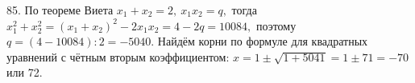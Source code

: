 85. По теореме Виета $x_1+x_2=2,\ x_1x_2=q,$ тогда $x_1^2+x_2^2=(x_1+x_2)^2-2x_1x_2=4-2q=10084,$ поэтому $q=(4-10084):2=-5040.$ Найдём корни по формуле для квадратных уравнений с чётным вторым коэффициентом: $x=1\pm\sqrt{1+5041}=1\pm71=-70$ или 72.\\
